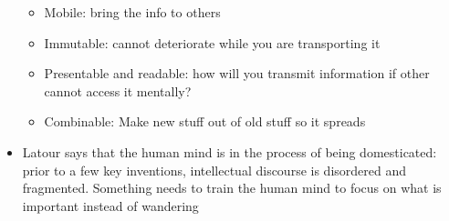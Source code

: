 \documentclass[a4paper]{article}
\begin{document}
\begin{itemize}
	\begin{itemize}[label=$\circ$]
		\item Mobile: bring the info to others
		\item Immutable: cannot deteriorate while you are transporting it
		\item Presentable and readable: how will you transmit information if other cannot access it mentally?
		\item Combinable: Make new stuff out of old stuff so it spreads
	\end{itemize}
	\item Latour says that the human mind is in the process of being domesticated: prior to a few key inventions, intellectual discourse is disordered and fragmented. Something needs to train the human mind to focus on what is important instead of wandering
\end{itemize}
\end{document}
